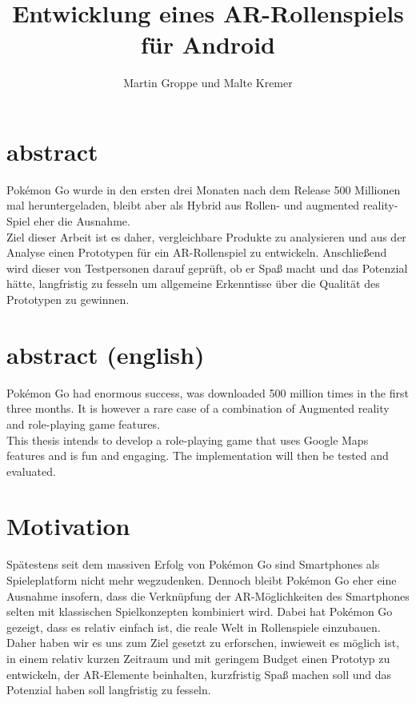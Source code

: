 \documentclass[extern,palatino]{cgBA}
\author{Martin Groppe und Malte Kremer}
\title{Entwicklung eines AR-Rollenspiels für Android}
\begin{document}


\maketitle

\newpage

\tableofcontents
\clearpage         %
{}


\section{abstract}

Pokémon Go wurde in den ersten drei Monaten nach dem Release 500 Millionen mal heruntergeladen, bleibt aber als Hybrid aus Rollen- und augmented reality-Spiel eher die Ausnahme. 
\\Ziel dieser Arbeit ist es daher, vergleichbare Produkte zu analysieren und aus der Analyse einen Prototypen für ein AR-Rollenspiel zu entwickeln. Anschließend wird dieser von Testpersonen darauf geprüft, ob er Spaß macht und das Potenzial hätte, langfristig zu fesseln um allgemeine Erkenntisse über die Qualität des Prototypen zu gewinnen.
\section{abstract (english)}
Pokémon Go had enormous success, was downloaded 500 million times in the first three months. It is however a rare case of a combination of Augmented reality and role-playing game features.
\\This thesis intends to develop a role-playing game that uses Google Maps features and is fun and engaging. The implementation will then be tested and evaluated.
\newpage
\section{Motivation}
Spätestens seit dem massiven Erfolg von Pokémon Go sind Smartphones als Spieleplatform nicht mehr wegzudenken. Dennoch bleibt Pokémon Go eher eine Ausnahme insofern, dass die Verknüpfung der AR-Möglichkeiten des Smartphones selten mit klassischen Spielkonzepten kombiniert wird. Dabei hat Pokémon Go gezeigt, dass es relativ einfach ist, die reale Welt in Rollenspiele einzubauen. \\Daher haben wir es uns zum Ziel gesetzt zu erforschen, inwieweit es möglich ist, in einem relativ kurzen Zeitraum und mit geringem Budget einen Prototyp zu entwickeln, der AR-Elemente beinhalten, kurzfristig Spaß machen soll und das Potenzial haben soll langfristig zu fesseln.
\newpage
\end{document}
